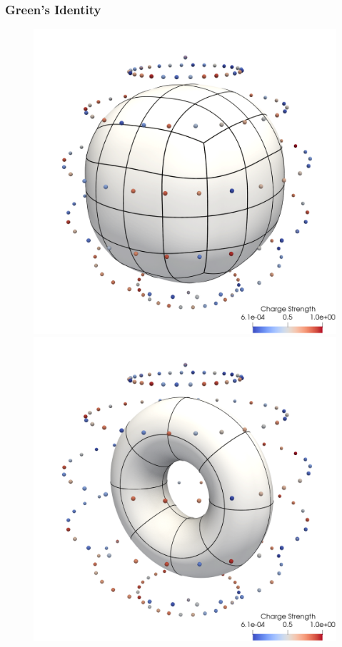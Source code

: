 \subsubsection{Green's Identity}
\begin{figure}[!htb]
  \centering
  \begin{minipage}{.5\textwidth}
      \centering
    \includegraphics[width=\linewidth]{figs/cube_convergence_setup}
  \end{minipage}\hfill
  \begin{minipage}{.5\textwidth}
      \centering
    \includegraphics[width=\linewidth]{figs/newtorus_convergence_setup}

\end{minipage}
\end{figure}
